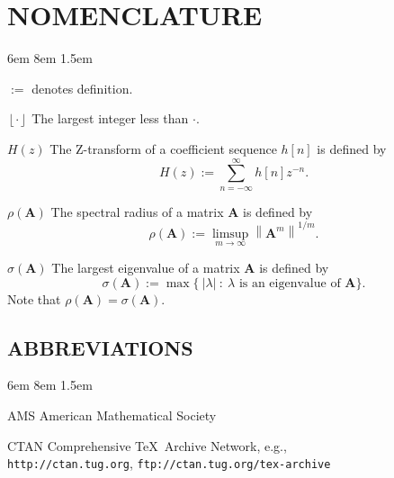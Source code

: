 
\chapter*{NOMENCLATURE}

\begin{list} {} { 6em \leftmargin 8em  1.5em}

\item[$:=$] denotes definition.

\item[$\left\lfloor \cdot \right\rfloor$] The largest integer less than
	$\cdot$.

\item[$H(z)$] The Z-transform of a coefficient sequence $h[n]$ is
    defined by
    $$
	H(z) := \sum_{n=-\infty}^\infty h[n] z^{-n}.
    $$

\item[$\rho(\mathbf{A})$] The spectral radius of a matrix $\mathbf{A}$ is defined
    by
    \[
	\rho(\mathbf{A}) := \limsup_{m\rightarrow\infty} \left\|\mathbf{A}^m\right\|^{1/m}.
    \]

\item[$\sigma(\mathbf{A})$] The largest eigenvalue of a matrix $\mathbf{A}$ is
	defined by
    \[
	\sigma(\mathbf{A}) := \max\{\:\left|\lambda\right|\::\: \mbox{$\lambda$ is an
				eigenvalue of $\mathbf{A}$}\}.
    \]
    Note that $\rho(\mathbf{A}) = \sigma(\mathbf{A}).$

\end{list}

\section*{ABBREVIATIONS}

\begin{list} {} { 6em \leftmargin 8em  1.5em}

\item[AMS]  American Mathematical Society
\item[CTAN] Comprehensive \TeX\ Archive Network, e.g., \\
	\verb|http://ctan.tug.org|, 
	\verb|ftp://ctan.tug.org/tex-archive|

\end{list}
